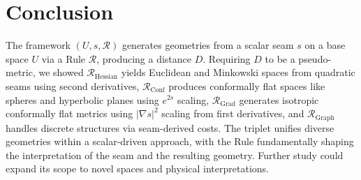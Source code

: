 \documentclass[twoside,twocolumn]{article}
\begin{document}

\setcounter{equation}{0}
\section{Conclusion}
The framework \( (U, s, \mathcal{R}) \) generates geometries from a scalar seam \( s \) on a base space \( U \) via a Rule \( \mathcal{R} \), producing a distance \( D \). Requiring \( D \) to be a pseudo-metric, we showed \( \mathcal{R}_{\text{Hessian}} \) yields Euclidean and Minkowski spaces from quadratic seams using second derivatives, \( \mathcal{R}_{\text{Conf}} \) produces conformally flat spaces like spheres and hyperbolic planes using \( e^{2s} \) scaling, \( \mathcal{R}_{\text{Grad}} \) generates isotropic conformally flat metrics using \( |\nabla s|^2 \) scaling from first derivatives, and \( \mathcal{R}_{\text{Graph}} \) handles discrete structures via seam-derived costs. The triplet unifies diverse geometries within a scalar-driven approach, with the Rule fundamentally shaping the interpretation of the seam and the resulting geometry. Further study could expand its scope to novel spaces and physical interpretations.


\end{document}
